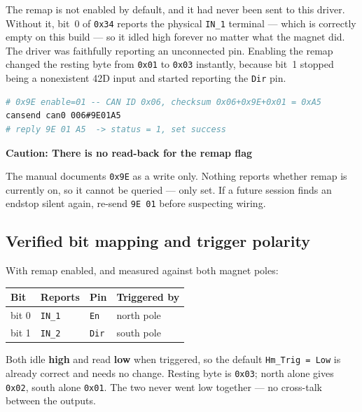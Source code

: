 \documentclass[11pt,letterpaper]{article}
\newenvironment{caution}[1]{%
    \par\addvspace{8pt}%
    \noindent{\color{cautionred}\rule{\linewidth}{0.8pt}}\par\vspace{2pt}
    \noindent\textbf{\color{cautionred}Caution: #1}\par\vspace{2pt}
}{%
    \par\vspace{2pt}\noindent{\color{cautionred}\rule{\linewidth}{0.4pt}}%
    \par\addvspace{8pt}%
}
\begin{document}
The remap is not enabled by default, and it had never been sent to this driver.
Without it, bit~0 of \texttt{0x34} reports the physical \texttt{IN\_1} terminal
--- which is correctly empty on this build --- so it idled high forever no
matter what the magnet did. The driver was faithfully reporting an unconnected
pin. Enabling the remap changed the resting byte from \texttt{0x01} to
\texttt{0x03} instantly, because bit~1 stopped being a nonexistent 42D input and
started reporting the \texttt{Dir} pin.

\begin{lstlisting}[language=bash, caption=Enable limit port remap on Joint C]
# 0x9E enable=01 -- CAN ID 0x06, checksum 0x06+0x9E+0x01 = 0xA5
cansend can0 006#9E01A5
# reply 9E 01 A5  -> status = 1, set success
\end{lstlisting}

\begin{caution}{There is no read-back for the remap flag}
The manual documents \texttt{0x9E} as a write only. Nothing reports whether
remap is currently on, so it cannot be queried --- only set. If a future session
finds an endstop silent again, re-send \texttt{9E 01} before suspecting wiring.
\end{caution}

\subsection{Verified bit mapping and trigger polarity}
With remap enabled, and measured against both magnet poles:
\begin{center}
\begin{tabular}{llll}
\toprule
\textbf{Bit} & \textbf{Reports} & \textbf{Pin} & \textbf{Triggered by} \\ \midrule
bit 0 & \texttt{IN\_1} & \texttt{En}  & north pole \\
bit 1 & \texttt{IN\_2} & \texttt{Dir} & south pole \\ \bottomrule
\end{tabular}
\end{center}
Both idle \textbf{high} and read \textbf{low} when triggered, so the default
\texttt{Hm\_Trig = Low} is already correct and needs no change. Resting byte is
\texttt{0x03}; north alone gives \texttt{0x02}, south alone \texttt{0x01}. The
two never went low together --- no cross-talk between the outputs.
\end{document}

